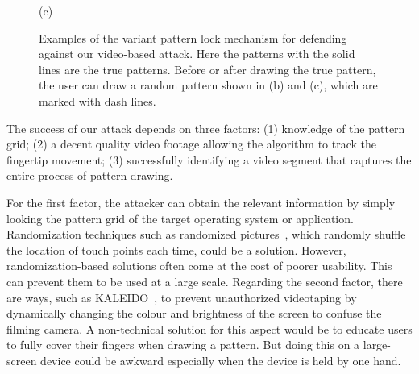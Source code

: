 \begin{figure}[!t]
{\begin{minipage}[t]{0.11\textwidth}
                \centering \footnotesize (c)
             \end{minipage}
        }
        \caption{Examples of the variant pattern lock mechanism for defending against our video-based attack. Here the patterns with the solid lines are the true patterns.
        Before or after drawing the true pattern, the user can draw a random pattern shown in (b) and (c), which are marked with dash lines. 
        }
        \label{fig:protection}
    \end{figure}



The success of our attack depends on three factors: (1)
knowledge of the pattern grid; (2) a decent
quality video footage allowing the algorithm to track the fingertip movement;
(3) successfully identifying a video segment that captures the entire process of pattern drawing.

For the first factor, the attacker can obtain the relevant information by simply looking the pattern grid
of the target operating system or application.
Randomization techniques such as
randomized pictures~\cite{biddle2012graphical,hossein2015fortifying}, which randomly shuffle the location
of touch points each time, could be a solution.
However, randomization-based solutions often come at the cost of poorer
usability. This can prevent them to be used at a large scale.
Regarding the second factor, there are ways, such as
KALEIDO~\cite{zhang2015kaleido}, to prevent unauthorized videotaping by
dynamically changing the colour and brightness of the screen to confuse the
filming camera. A non-technical solution for this aspect would be to educate users to
fully cover their fingers when drawing a pattern. But doing this on a large-screen device could be awkward especially when the device is held by one hand.



